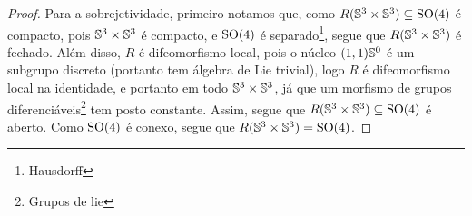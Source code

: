 \begin{proof}
Para a sobrejetividade, primeiro notamos que, como $R(\S^3 \times \S^3) \subseteq \SO(4)$ é compacto, pois $\S^3 \times \S^3$ é compacto, e $\SO(4)$ é separado\footnote{Hausdorff}, segue que $R(\S^3 \times \S^3)$ é fechado. Além disso, $R$ é difeomorfismo local, pois o núcleo $(1,1)\S^0$ é um subgrupo discreto (portanto tem álgebra de Lie trivial), logo $R$ é difeomorfismo local na identidade, e portanto em todo $\S^3 \times \S^3$, já que um morfismo de grupos diferenciáveis\footnote{Grupos de lie} tem posto constante. Assim, segue que $R(\S^3 \times \S^3) \subseteq \SO(4)$ é aberto. Como $\SO(4)$ é conexo, segue que $R(\S^3 \times \S^3) = \SO(4)$.
\end{proof}



\begin{comment}

Lembremos que, pela decomposição polar, todo $u \in \S^3$ pode ser escrito como
	\begin{equation*}
	u = \cos(\phi) + \sin(\phi)\hat{u} = \ee^{\phi \hat{u}},
	\end{equation*}
com $\phi = \cos(\esc{u}) \in \intff{0}{\tau \div 2}$ e $\hat{u} = \frac{\vec{u}}{\nor{\hat{u}}} \in \vec{\S}^2$.





Definimos a função
	\begin{align*}
	\func{R}{\S^3 \times \S^3}{\SO(3)}{(u,u')}{
		\begin{aligned}[t]
		\func{R^{2\phi}_{\hat{u}}}{\vec{\R}^3}{\vec{\R}^3}{x}{\ee^{\phi \hat{u}}x\ee^{-\phi \hat{u}}}
		\end{aligned}
	}
	\end{align*}

\end{comment}